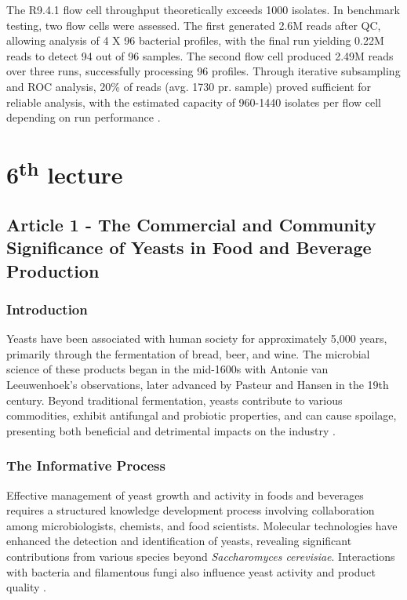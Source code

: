 The R9.4.1 flow cell throughput theoretically exceeds 1000 isolates. In benchmark testing, two flow cells were assessed. The first generated 2.6M reads after QC, allowing analysis of 4 X 96 bacterial profiles, with the final run yielding 0.22M reads to detect 94 out of 96 samples. The second flow cell produced 2.49M reads over three runs, successfully processing 96 profiles. Through iterative subsampling and ROC analysis, 20\% of reads (avg. 1730 pr. sample) proved sufficient for reliable analysis, with the estimated capacity of 960-1440 isolates per flow cell depending on run performance \cite*{L5-DNAEnrichment}.

\section{6\texorpdfstring{\textsuperscript{th}}{th} lecture}
\subsection{Article 1 -  The Commercial and Community Significance of Yeasts in Food and Beverage Production}
\subsubsection*{Introduction}
Yeasts have been associated with human society for approximately 5,000 years, primarily through the fermentation of bread, beer, and wine. The microbial science of these products began in the mid-1600s with Antonie van Leeuwenhoek's observations, later advanced by Pasteur and Hansen in the 19th century. Beyond traditional fermentation, yeasts contribute to various commodities, exhibit antifungal and probiotic properties, and can cause spoilage, presenting both beneficial and detrimental impacts on the industry \cite*{L6-Yeasts}.

\subsubsection*{The Informative Process}
Effective management of yeast growth and activity in foods and beverages requires a structured knowledge development process involving collaboration among microbiologists, chemists, and food scientists. Molecular technologies have enhanced the detection and identification of yeasts, revealing significant contributions from various species beyond \textit{Saccharomyces cerevisiae}. Interactions with bacteria and filamentous fungi also influence yeast activity and product quality \cite*{L6-Yeasts}.


